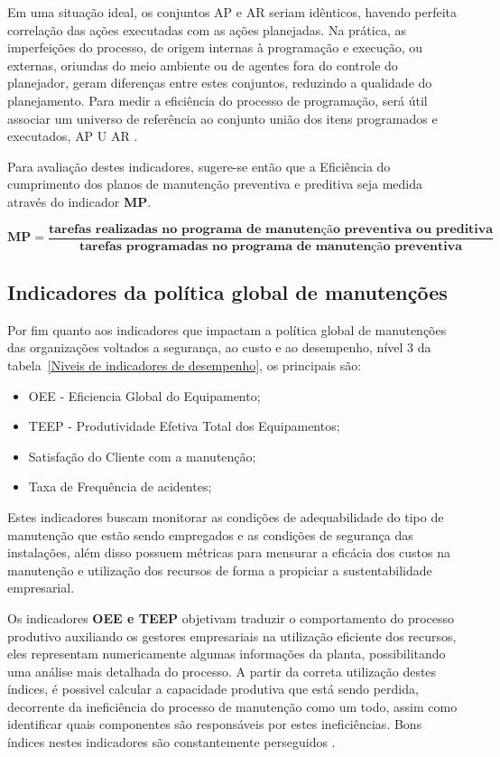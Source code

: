 Em uma situação ideal, os conjuntos {AP} e {AR} seriam idênticos, havendo perfeita correlação das ações executadas com as ações planejadas. Na prática, as imperfeições do processo, de origem internas à programação e execução, ou externas, oriundas do meio ambiente ou de agentes fora do controle do planejador, geram diferenças entre estes conjuntos, reduzindo a qualidade do planejamento. Para medir a eficiência do processo de programação, será útil associar um universo de referência ao conjunto união dos itens programados e executados, { AP U AR } \cite{de2006indicadores}.

Para avaliação destes indicadores, sugere-se então que a Eficiência do cumprimento dos planos de manutenção preventiva e preditiva seja medida através do indicador \textbf{MP}.

\begin{equation}
\label{eqn05}
	\mathbf{MP} = \mathbf{\frac{\textrm{tarefas realizadas no programa de manutenção preventiva ou preditiva}}{\textrm{tarefas programadas no programa de manutenção preventiva}}} 
\end{equation}

\subsection{Indicadores da política global de manutenções}
\label{nivel 3}

Por fim quanto aos indicadores que impactam a política global de manutenções das organizações voltados a segurança, ao custo e ao desempenho, nível 3 da tabela~\ref{Niveis de indicadores de desempenho}, os principais são:

\begin{itemize}
	\item OEE - Eficiencia Global do Equipamento;
	\item TEEP - Produtividade Efetiva Total dos Equipamentos;
	\item Satisfação do Cliente com a manutenção;	
	\item Taxa de Frequência de acidentes;
	\end{itemize}

Estes indicadores buscam monitorar as condições de adequabilidade do tipo de manutenção que estão sendo empregados e as condições de segurança das instalações, além disso possuem métricas para mensurar a eficácia dos custos na manutenção e utilização dos recursos de forma a propiciar a sustentabilidade empresarial.

Os indicadores \textbf{OEE e TEEP} objetivam traduzir o comportamento do processo produtivo auxiliando os gestores empresariais na utilização eficiente dos recursos, eles representam numericamente algumas informações da planta, possibilitando uma análise mais detalhada do processo. A partir da correta utilização destes índices, é possivel calcular a capacidade produtiva que está sendo perdida, decorrente da ineficiência do processo de manutenção como um todo, assim como identificar quais componentes são responsáveis por estes ineficiências. Bons índices nestes indicadores são constantemente perseguidos \cite{de1999analise}.

